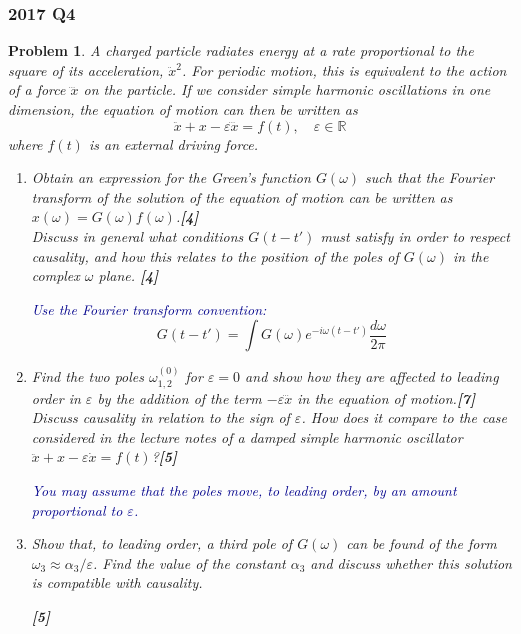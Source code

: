 \documentclass[a4paper]{article}
\theoremstyle{new}
\newtheorem{qns}{Problem}[section]
\begin{document}
\subsubsection*{2017 Q4}
\begin{qns}
A charged particle radiates energy at a rate proportional to the square of its
acceleration, $\ddot{x}^2$. For periodic motion, this is equivalent to the action of a force $\dddot{x}$ on the particle. If we consider simple harmonic oscillations in one dimension, the equation of motion can then be written as
$$\ddot{x}+x-\varepsilon\dddot{x}=f(t),\quad\varepsilon\in\mathbb{R}$$
where $f(t)$ is an external driving force.
\begin{enumerate}[label=(\alph*)]
\item Obtain an expression for the Green’s function $G(\omega)$ such that the Fourier transform of the solution of the equation of motion can be written as $x(\omega) = G(\omega)f(\omega)$.\hfill\textbf{[4]}\\[5pt]
Discuss in general what conditions $G(t − t')$ must satisfy in order to respect
causality, and how this relates to the position of the poles of $G(\omega)$ in the complex $\omega$ plane. \hfill\textbf{[4]}

\begin{mdframed}
\textcolor{darkblue}{Use the Fourier transform convention:}
$$G(t-t')=\int G(\omega)e^{-i\omega(t-t')}\frac{d\omega}{2\pi}$$
\end{mdframed}
\item Find the two poles $\omega^{(0)}_{1,2}$ for $\varepsilon=0$ and show how they are affected to leading order in $\varepsilon$ by the addition of the term $-\varepsilon\dddot{x}$ in the equation of motion.\hfill\textbf{[7]}\\[5pt]
Discuss causality in relation to the sign of $\varepsilon$. How does it compare to the case considered in the lecture notes of a damped simple harmonic oscillator $\ddot{x}+x − \varepsilon\dot{x} = f(t)$?\hfill\textbf{[5]}

\begin{mdframed}
\textcolor{darkblue}{You may assume that the poles move, to leading order, by an amount proportional to $\varepsilon$.}
\end{mdframed}
\item Show that, to leading order, a third pole of $G(\omega)$ can be found of the
form $\omega_3\approx\alpha_3/\varepsilon$. Find the value of the constant $\alpha_3$ and discuss whether this solution is compatible with causality.

\hfill\textbf{[5]}
\end{enumerate}
\end{qns}
\end{document}
